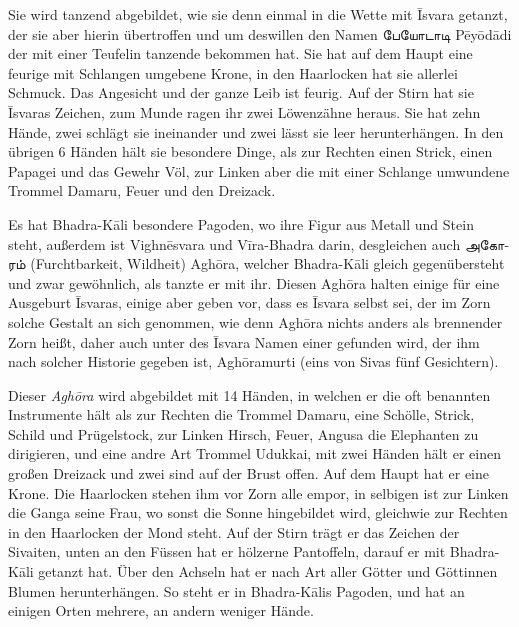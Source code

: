 \documentclass{article}
\newcommand{\TamilText}[1]{\texttamil{#1}}
\newcommand{\tam}[1]{\TamilText{#1}}
\begin{document}
Sie wird tanzend abgebildet, wie sie denn einmal in die Wette mit \={I}svara getanzt, der sie aber hierin übertroffen und um deswillen den Namen \tam{பேயோடாடி} P\={e}y\={o}d\={a}di der mit einer Teufelin tanzende bekommen hat. Sie hat auf dem Haupt eine feurige mit Schlangen umgebene Krone, in den Haarlocken hat sie allerlei Schmuck. Das Angesicht und der ganze Leib ist feurig. Auf der Stirn hat sie \={I}svaras Zeichen, zum Munde ragen ihr zwei Löwenzähne heraus. Sie hat zehn Hände, zwei schlägt sie ineinander und zwei lässt sie leer herunterhängen. In den übrigen 6 Händen hält sie besondere Dinge, als zur Rechten einen Strick, einen Papagei und das Gewehr Völ, zur Linken aber die mit einer Schlange umwundene Trommel Damaru, Feuer und den Dreizack.

Es hat Bhadra-K\={a}li besondere Pagoden, wo ihre Figur aus Metall und Stein steht, außerdem ist Vighn\={e}svara und V\={i}ra-Bhadra darin, desgleichen auch \tam{அகோரம்} (Furchtbarkeit, Wildheit) Agh\={o}ra, welcher Bhadra-K\={a}li gleich gegenübersteht und zwar gewöhnlich, als tanzte er mit ihr. Diesen Agh\={o}ra halten einige für eine Ausgeburt \={I}svaras, einige aber geben vor, dass es \={I}svara selbst sei, der im Zorn solche Gestalt an sich genommen, wie denn Agh\={o}ra nichts anders als brennender Zorn heißt, daher auch unter des \={I}svara Namen einer gefunden wird, der ihm nach solcher Historie gegeben ist, Agh\={o}ramurti (eins von Sivas fünf Gesichtern).

Dieser \emph{Agh\={o}ra} wird abgebildet mit 14 Händen, in welchen er die oft benannten Instrumente hält als zur Rechten die Trommel Damaru, eine Schölle, Strick, Schild und Prügelstock, zur Linken Hirsch, Feuer, Angusa die Elephanten zu dirigieren, und eine andre Art Trommel Udukkai, mit zwei Händen hält er einen großen Dreizack und zwei sind auf der Brust offen. Auf dem Haupt hat er eine Krone. Die Haarlocken stehen ihm vor Zorn alle empor, in selbigen ist zur Linken die Ganga seine Frau, wo sonst die Sonne hingebildet wird, gleichwie zur Rechten in den Haarlocken der Mond steht. Auf der Stirn trägt er das Zeichen der Sivaiten, unten an den Füssen hat er hölzerne Pantoffeln, darauf er mit Bhadra-K\={a}li getanzt hat. Über den Achseln hat er nach Art aller Götter und Göttinnen Blumen herunterhängen. So steht er in Bhadra-K\={a}lis Pagoden, und hat an einigen Orten mehrere, an andern weniger Hände.
\end{document}
